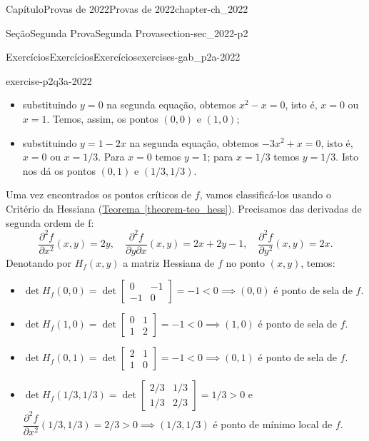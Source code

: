 \documentclass[oneside,10pt,]{book}
\newcommand{\xreffont}{\relax}
\numberwithin{equation}{section}
\begin{document}
\begin{chapterptx}{Capítulo}{Provas de 2022}{}{Provas de 2022}{}{}{chapter-ch_2022}
\begin{sectionptx}{Seção}{Segunda Prova}{}{Segunda Prova}{}{}{section-sec_2022-p2}
\begin{exercises-subsection-numberless}{Exercícios}{Exercícios}{}{Exercícios}{}{}{exercises-gab_p2a-2022}
\begin{divisionexercise}{3}{}{}{exercise-p2q3a-2022}
\begin{itemize}[label=\textbullet]
\item{}substituindo \(y=0\) na segunda equação, obtemos \(x^2-x=0\), isto é, \(x=0\) ou \(x=1\). Temos, assim, os pontos \((0,0)\) e \((1,0)\);%
\item{}substituindo \(y=1-2x\) na segunda equação, obtemos \(-3x^2+x=0\), isto é, \(x=0\) ou \(x=1/3\). Para \(x=0\) temos \(y=1\); para \(x=1/3\) temos \(y=1/3\). Isto nos dá os pontos \((0,1)\) e \((1/3,1/3)\).%
\end{itemize}
%
\par
Uma vez encontrados os pontos críticos de \(f\), vamos classificá-los usando o Critério da Hessiana (\hyperref[theorem-teo_hess]{Teorema~{\xreffont\ref{theorem-teo_hess}}}). Precisamos das derivadas de segunda ordem de \textdollar{}f\textdollar{}:%
\begin{equation*}
\frac{\partial^2 f}{\partial x^2}(x,y) = 2y, \quad
\frac{\partial^2 f}{\partial y\partial x}(x,y) = 2x+2y-1, \quad
\frac{\partial^2 f}{\partial y^2}(x,y) = 2x.
\end{equation*}
Denotando por \(H_f(x,y)\) a matriz Hessiana de \(f\) no ponto \((x,y)\), temos:%
\begin{itemize}[label=\textbullet]
\item{}\(\det H_f(0,0) = \det\begin{bmatrix} 0 &
-1\\ -1 & 0 \end{bmatrix} = -1 < 0 \implies (0,0)\) é ponto de sela de \(f\).%
\item{}\(\det H_f(1,0) = \det\begin{bmatrix} 0 & 1\\ 1 & 2
\end{bmatrix} = -1 < 0 \implies (1,0)\) é ponto de sela de \(f\).%
\item{}\(\det H_f(0,1) = \det\begin{bmatrix} 2 & 1\\ 1 & 0 \end{bmatrix} =
-1 < 0 \implies (0,1)\) é ponto de sela de \(f\).%
\item{}\(\det H_f(1/3,1/3) = \det\begin{bmatrix} 2/3 & 1/3\\ 1/3 & 2/3
\end{bmatrix} = 1/3 > 0\) e \(\dfrac{\partial^2
f}{\partial x^2}(1/3,1/3) = 2/3> 0 \implies (1/3,1/3)\) é ponto de mínimo local de \(f\).%
\end{itemize}
%
\end{divisionexercise}%

\end{exercises-subsection-numberless}
\end{sectionptx}
\end{chapterptx}
\end{document}
